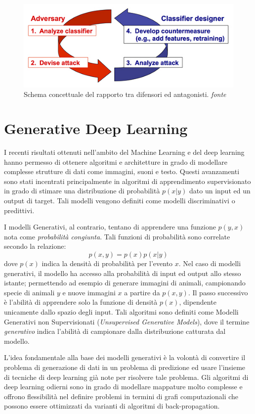 \begin{figure}[!bp]
	\centering
	\includegraphics[width=\columnwidth]{figures/Reactive_arms_race.jpg}
	\caption{Schema concettuale del rapporto tra difensori ed antagonisti. \textit{fonte}%
	~\cite{wiki:Adversarial_machine_learning} \label{fig:advarms} }
\end{figure}


\newpage
\section{Generative Deep Learning}
\label{sec:gan}
I recenti risultati ottenuti nell'ambito del Machine Learning e del deep learning hanno permesso di ottenere algoritmi e architetture in grado di modellare complesse strutture di dati come immagini, suoni e testo. Questi avanzamenti sono stati incentrati principalmente in algoritmi di apprendimento supervisionato in grado di stimare una distribuzione di probabilità $p(x|y)$ dato un input ed un output di target. Tali modelli vengono definiti come modelli discriminativi o predittivi.

I modelli Generativi, al contrario, tentano di apprendere una funzione $p(y,x)$ nota come \textit{probabilità congiunta}. Tali funzioni di probabilità sono correlate secondo la relazione: 
\[p(x,y)=p(x)p(x|y)\]
dove $p(x)$ indica la densità di probabilità per l'evento $x$. 
Nel caso di modelli generativi, il modello ha accesso alla probabilità di input ed output allo stesso istante; permettendo ad esempio di generare immagini di animali, campionando specie di animali $y$ e nuove immagini $x$ a partire da $p(x,y)$.
Il passo successivo è l'abilità di apprendere solo la funzione di densità $p(x)$, dipendente unicamente dallo spazio degli input. Tali algoritmi sono definiti come Modelli Generativi non Supervisionati (\textit{Unsupervised Generative Models}), dove il termine \textit{generativo} indica l'abilità di campionare dalla distribuzione catturata dal modello. 

L'idea fondamentale alla base dei modelli generativi è la volontà di convertire il problema di generazione di dati in un problema di predizione ed usare l'insieme di tecniche di deep learning già note per risolvere tale problema. Gli algoritmi di deep learning odierni sono in grado di modellare mappature molto complesse e offrono flessibilità nel definire problemi in termini di grafi computazionali che possono essere ottimizzati da varianti di algoritmi di back-propagation.

